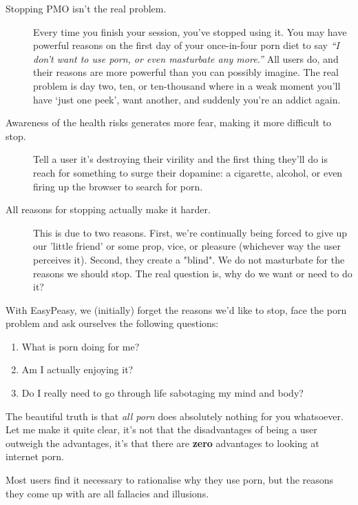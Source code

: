 \documentclass[easypeasy.tex]{subfiles}
\begin{document}
\begin{description}
  \item [Stopping PMO isn't the real problem.] Every time you finish your session, you've stopped using it. You may have powerful reasons on the first day of your once-in-four porn diet to say \textit{``I don't want to use porn, or even masturbate any more.''} All users do, and their reasons are more powerful than you can possibly imagine. The real problem is day two, ten, or ten-thousand where in a weak moment you'll have `just one peek', want another, and suddenly you're an addict again.

  \item [Awareness of the health risks generates more fear, making it more difficult to stop.] Tell a user it's destroying their virility and the first thing they'll do is reach for something to surge their dopamine: a cigarette, alcohol, or even firing up the browser to search for porn.

  \item [All reasons for stopping actually make it harder.] This is due to two reasons. First, we're continually being forced to give up our 'little friend' or some prop, vice, or pleasure (whichever way the user perceives it). Second, they create a "blind". We do not masturbate for the reasons we should stop. The real question is, why do we want or need to do it?
\end{description}

With EasyPeasy, we (initially) forget the reasons we'd like to stop, face the porn problem and ask ourselves the following questions:

\begin{enumerate}
\item What is porn doing for me?
\item Am I actually enjoying it?
\item Do I really need to go through life sabotaging my mind and body?
\end{enumerate}

The beautiful truth is that \textit{all porn} does absolutely nothing for you whatsoever. Let me make it quite clear, it's not that the disadvantages of being a user outweigh the advantages, it's that there are \textbf{zero} advantages to looking at internet porn.

Most users find it necessary to rationalise why they use porn, but the reasons they come up with are all fallacies and illusions.
\end{document}
